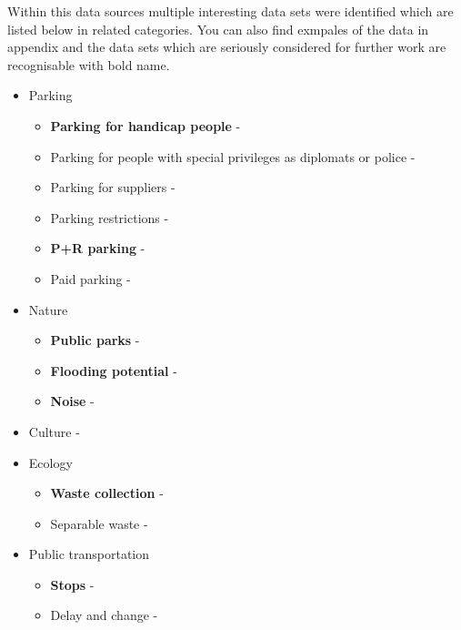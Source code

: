 \documentclass{article}
\begin{document}
Within this data sources multiple interesting data sets were identified which are listed below in related categories. You can also find exmpales of the data in appendix and the data sets which are seriously considered for further work are recognisable with bold name.

\begin{itemize}
    \item Parking
    \begin{itemize}
        \item \textbf{Parking for handicap people} - \cite{Vyhrazen70:online,Vyhrazen35:online}
        \item Parking for people with special privileges as diplomats or police -  \cite{Vyhrazen81:online}
        \item Parking for suppliers - \cite{Vyhrazen63:online} 
        \item Parking restrictions - \cite{zakazy:online}
        \item \textbf{P+R parking} - \cite{wwwtskpr83:online,Zachytna0:online}
        \item Paid parking - \cite{usekypar48:online,Zonyplac33:online}
    \end{itemize}
    \item Nature
        \begin{itemize}
            \item \textbf{Public parks} - \cite{parky:online}
            \item \textbf{Flooding potential} - \cite{zaplavy:online}
            \item \textbf{Noise} - \cite{hluk1:online,hluk2:online}
        \end{itemize}
    \item Culture - \cite{kudyznudy:online,informujpraha:online}
    \item Ecology
        \begin{itemize}
            \item \textbf{Waste collection} - \cite{Velkoobj59:online,Harmonog59:online,McPraha279:online,Velkoobj47:online}
            \item Separable waste - \cite{Stanovis12:online,Stanovis75:online}
        \end{itemize}
    \item Public transportation
        \begin{itemize}
            \item \textbf{Stops} - \cite{Vstupydo88:online}
            \item Delay and change - \cite{DPPczZme13:online,DPPczMim53:online}

\end{itemize}
\end{itemize}
\end{document}
